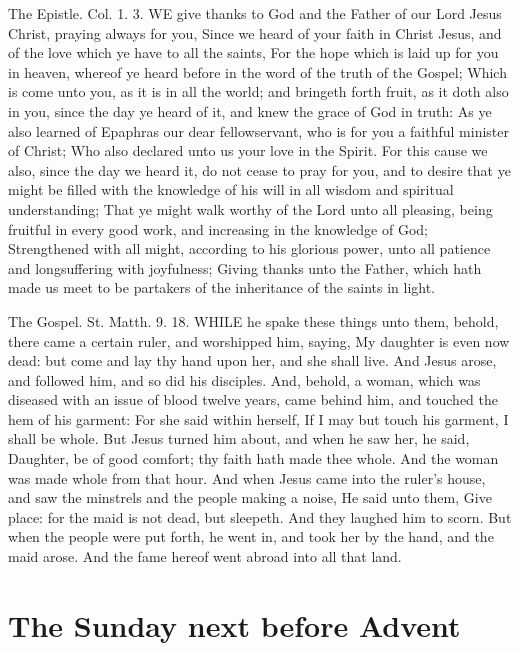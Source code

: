 The Epistle. Col. 1. 3.
WE give thanks to God and the Father of our Lord Jesus Christ, praying always for you, Since we heard of your faith in Christ Jesus, and of the love which ye have to all the saints, For the hope which is laid up for you in heaven, whereof ye heard before in the word of the truth of the Gospel; Which is come unto you, as it is in all the world; and bringeth forth fruit, as it doth also in you, since the day ye heard of it, and knew the grace of God in truth: As ye also learned of Epaphras our dear fellowservant, who is for you a faithful minister of Christ; Who also declared unto us your love in the Spirit. For this cause we also, since the day we heard it, do not cease to pray for you, and to desire that ye might be filled with the knowledge of his will in all wisdom and spiritual understanding; That ye might walk worthy of the Lord unto all pleasing, being fruitful in every good work, and increasing in the knowledge of God; Strengthened with all might, according to his glorious power, unto all patience and longsuffering with joyfulness; Giving thanks unto the Father, which hath made us meet to be partakers of the inheritance of the saints in light.


The Gospel. St. Matth. 9. 18.
WHILE he spake these things unto them, behold, there came a certain ruler, and worshipped him, saying, My daughter is even now dead: but come and lay thy hand upon her, and she shall live. And Jesus arose, and followed him, and so did his disciples. And, behold, a woman, which was diseased with an issue of blood twelve years, came behind him, and touched the hem of his garment: For she said within herself, If I may but touch his garment, I shall be whole. But Jesus turned him about, and when he saw her, he said, Daughter, be of good comfort; thy faith hath made thee whole. And the woman was made whole from that hour. And when Jesus came into the ruler's house, and saw the minstrels and the people making a noise, He said unto them, Give place: for the maid is not dead, but sleepeth. And they laughed him to scorn. But when the people were put forth, he went in, and took her by the hand, and the maid arose. And the fame hereof went abroad into all that land.

\section{The Sunday next before Advent}
